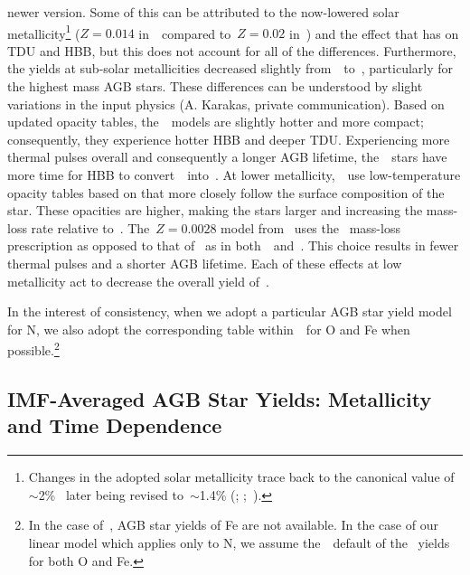 \documentclass[ms.tex]{subfiles}
\begin{document}
newer version.
Some of this can be attributed to the now-lowered solar metallicity\footnote{
Changes in the adopted solar metallicity trace back to the canonical value of
$\sim$2\%~\citep*{Anders1989, Grevesse1993, Grevesse1998} later being revised
to~$\sim$1.4\% (\citealp*{Lodders2003, Asplund2005, Lodders2009};
\citealp{Asplund2009};~\citealp*{Asplund2021}).
} ($Z = 0.014$ in~\karakas~compared to~$Z = 0.02$ in~\karakasten) and the
effect that has on TDU and HBB, but this does not account for all of the
differences.
Furthermore, the yields at sub-solar metallicities decreased slightly
from~\karakasten~to~\karakas, particularly for the highest mass AGB stars.
These differences can be understood by slight variations in the input physics
(A. Karakas, private communication).
Based on updated opacity tables, the~\karakas~models are slightly hotter and
more compact; consequently, they experience hotter HBB and deeper TDU.
Experiencing more thermal pulses overall and consequently a longer AGB lifetime,
the~\karakas~stars have more time for HBB to convert~\Ctwelve~into~\Nfourteen.
At lower metallicity,~\karakas~use low-temperature opacity tables based on
\citet{Marigo2002} that more closely follow the surface composition of the
star.
These opacities are higher, making the stars larger and increasing the
mass-loss rate relative to~\karakasten.
The~$Z = 0.0028$ model from~\citet{Karakas2018} uses the~\citet{Bloecker1995}
mass-loss prescription as opposed to that of~\citet{Vassiliadis1993} as in
both~\citet{Karakas2010}~and~\citet{Karakas2016}.
This choice results in fewer thermal pulses and a shorter AGB lifetime.
Each of these effects at low metallicity act to decrease the overall yield
of~\Nfourteen.
\par
In the interest of consistency, when we adopt a particular AGB star yield model
for N, we also adopt the corresponding table within~\vice~for O and Fe when
possible.\footnote{
	In the case of~\citet{Ventura2013, Ventura2014, Ventura2018, Ventura2020},
	AGB star yields of Fe are not available.
	In the case of our linear model which applies only to N, we assume 
	the~\vice~default of the~\citet{Cristallo2011, Cristallo2015} yields for
	both O and Fe.
}

\subsection{IMF-Averaged AGB Star Yields: Metallicity and Time Dependence}
\label{sec:yields:imf_agb}
\end{document}
